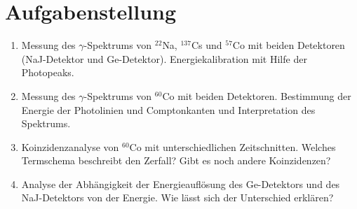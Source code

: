 \chapter*{Aufgabenstellung}
\begin{enumerate}
    \item Messung des $\gamma$-Spektrums von $^{22}$Na, $^{137}$Cs und $^{57}$Co mit beiden Detektoren (NaJ-Detektor
    und Ge-Detektor). Energiekalibration mit Hilfe der Photopeaks.
    \item Messung des $\gamma$-Spektrums von $^{60}$Co mit beiden Detektoren. Bestimmung der Energie der Photolinien und Comptonkanten und Interpretation des Spektrums.
    \item Koinzidenzanalyse von $^{60}$Co mit unterschiedlichen Zeitschnitten. Welches Termschema beschreibt den Zerfall? Gibt es noch andere Koinzidenzen?
    \item Analyse der Abhängigkeit der Energieauflösung des Ge-Detektors und des NaJ-Detektors
    von der Energie. Wie lässt sich der Unterschied erklären?
\end{enumerate}